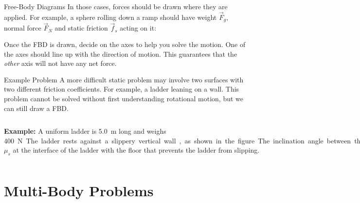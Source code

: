 \documentclass[12pt,compress,aspectratio=169]{beamer}
\begin{document}
\begin{frame}{Free-Body Diagrams}
  In those cases, forces should be drawn where they are applied. For example,
  a sphere rolling down a ramp should have weight $\vec F_g$, normal force
  $\vec F_N$ and static friction $\vec f_s$ acting on it:
  \begin{center}
  \end{center}
  Once the FBD is drawn, decide on the axes to help you solve the motion. One of
  the axes should line up with the direction of motion. This guarantees that
  the \emph{other} axis will not have any net force.
\end{frame}



\begin{frame}{Example Problem}
  A more difficult static problem may involve two surfaces with two different
  friction coefficients. For example, a ladder leaning on a wall. This problem
  cannot be solved without first understanding rotational motion, but we can
  still draw a FBD.
  \vspace{.2in}
  \begin{columns}
    \textbf{Example:} A uniform ladder is \SI{5.0}{\metre} long and weighs
    \SI{400}\newton. The ladder rests against a slippery vertical wall, as
    shown in the figure. The inclination angle between the ladder and the rough
    floor is \ang{53}. Find the reaction forces from the floor and
    from the wall on the ladder and the coefficient of static friction $\mu_s$
    at the interface of the ladder with the floor that prevents the ladder from
    slipping.

  \end{columns}
\end{frame}



\section{Multi-Body Problems}
\end{document}
